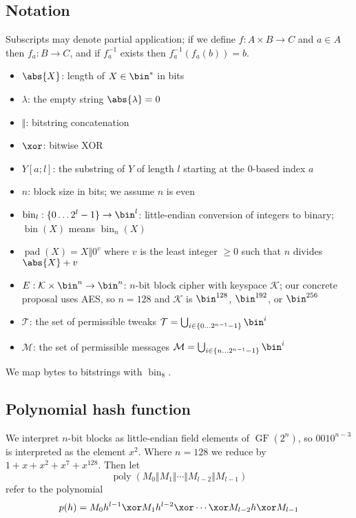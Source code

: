 \documentclass[letterpaper,11pt]{article}
\newcommand*{\Concat}{\Vert}
\DeclareMathOperator{\fromint}{bin}
\DeclareMathOperator{\GF}{GF}
\DeclareMathOperator{\pad}{pad}
\DeclareMathOperator{\poly}{poly}
\begin{document}
\subsection{Notation}
Subscripts may denote partial application; if we define $f: A \times B \rightarrow C$ and
$a \in A$ then $f_a: B \rightarrow C$, and if $f_a^{-1}$ exists then $f_a^{-1}(f_a(b)) = b$.
\begin{itemize}
    \item $\abs{X}$: length of $X \in \bin^{*}$ in bits
    \item $\lambda$: the empty string $\abs{\lambda} = 0$
    \item $\Concat$: bitstring concatenation
    \item \(\xor\): bitwise XOR
    \item $Y[a;l]$: the substring of $Y$ of length $l$ starting at the 0-based index $a$
    \item \(n\): block size in bits; we assume \(n\) is even
    \item $\fromint_l: \{0 \ldots 2^l-1\} \rightarrow \bin^l$:
    little-endian conversion of integers to binary; 
    \(\fromint(X)\) means \(\fromint_n(X)\)
    \item $\pad(X) = X \Concat 0^v$
    where $v$ is the least integer $\geq 0$ such that $n$ divides $\abs{X} + v$
    \item \(E: \mathcal{K} \times \bin^n \rightarrow \bin^n\): 
    \(n\)-bit block cipher with keyspace \(\mathcal{K}\);
    our concrete proposal uses AES, so \(n=128\) and \(\mathcal{K}\) is
    \(\bin^{128}\), \(\bin^{192}\), or \(\bin^{256}\)
    \item \(\mathcal{T}\): the set of permissible tweaks
    \(\mathcal{T} = \bigcup_{i \in \{0\ldots2^{n-1}-1\}}\bin^i\)
    \item \(\mathcal{M}\): the set of permissible messages
    \(\mathcal{M} = \bigcup_{i \in \{n\ldots2^{n-1}-1\}}\bin^i\)
\end{itemize}
We map bytes to bitstrings with \(\fromint_8\).

\subsection{Polynomial hash function}
We interpret \(n\)-bit blocks as little-endian field elements of \(\GF(2^n)\),
so \(0010^{n-3}\) is interpreted as the element \(x^2\).
Where \(n=128\) we reduce by
\(1 + x + x^2 + x^7 + x^{128}\). Then let
\begin{displaymath}
    \poly(M_0 \Concat M_1 \Concat \cdots \Concat M_{l-2} \Concat M_{l-1})
\end{displaymath}
refer to the polynomial
\begin{displaymath}
    p(h) = M_0h^{l-1} \xor M_1h^{l-2} \xor \cdots \xor M_{l-2}h \xor M_{l-1}
\end{displaymath}
\end{document}
